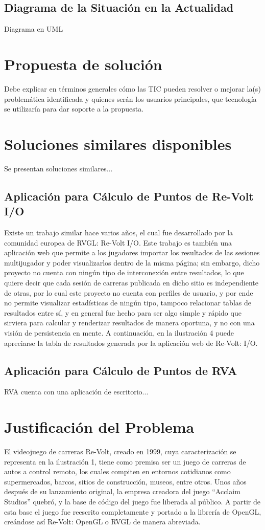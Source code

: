 \subsection{Diagrama de la Situación en la Actualidad}
Diagrama en UML

\section{Propuesta de solución}
Debe explicar en términos generales cómo las TIC pueden resolver o mejorar la(s) problemática identificada y quienes serán los usuarios principales, que tecnología se utilizaría para dar soporte a la propuesta.

\section{Soluciones similares disponibles}
Se presentan soluciones similares...

\subsection{Aplicación para Cálculo de Puntos de Re-Volt I/O}
Existe un trabajo similar hace varios años, el cual fue desarrollado por la comunidad europea de RVGL: Re-Volt I/O. Este trabajo es también una aplicación web que permite a los jugadores importar los resultados de las sesiones multijugador y poder visualizarlos dentro de la misma página; sin embargo, dicho proyecto no cuenta con ningún tipo de interconexión entre resultados, lo que quiere decir que cada sesión de carreras publicada en dicho sitio es independiente de otras, por lo cual este proyecto no cuenta con perfiles de usuario, y por ende no permite visualizar estadísticas de ningún tipo, tampoco relacionar tablas de resultados entre sí, y en general fue hecho para ser algo simple y rápido que sirviera para calcular y renderizar resultados de manera oportuna, y no con una visión de persistencia en mente. A continuación, en la ilustración 4 puede apreciarse la tabla de resultados generada por la aplicación web de Re-Volt: I/O.

\subsection{Aplicación para Cálculo de Puntos de RVA}
RVA cuenta con una aplicación de escritorio...

\section{Justificación del Problema}
El videojuego de carreras Re-Volt, creado en 1999, cuya caracterización se representa en la ilustración 1, tiene como premisa ser un juego de carreras de autos a control remoto, los cuales compiten en entornos cotidianos como supermercados, barcos, sitios de construcción, museos, entre otros.
Unos años después de su lanzamiento original, la empresa creadora del juego “Acclaim Studios” quebró, y la base de código del juego fue liberada al público. A partir de esta base el juego fue reescrito completamente y portado a la librería de OpenGL, creándose así Re-Volt: OpenGL o RVGL de manera abreviada.

